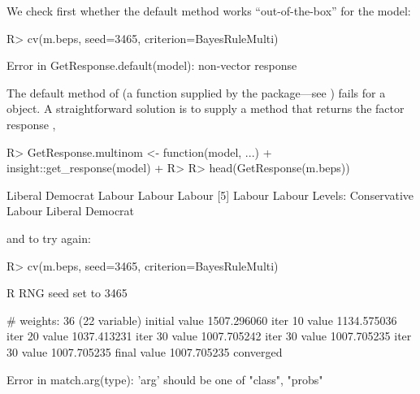 \documentclass[
]{jss}
\begin{document}
We check first whether the default  method works
``out-of-the-box'' for the  model:

\begin{CodeChunk}
\begin{CodeInput}
R> cv(m.beps, seed=3465, criterion=BayesRuleMulti)
\end{CodeInput}
\begin{CodeOutput}
Error in GetResponse.default(model): non-vector response
\end{CodeOutput}
\end{CodeChunk}

The default method of  (a function supplied by the
 package---see ) fails for a
 object. A straightforward solution is to supply a
 method that returns the factor response
\citep[using the \texttt{get\_response()} function from the
 package,][]{LudeckeWaggonerMakowski:2019},

\begin{CodeChunk}
\begin{CodeInput}
R> GetResponse.multinom <- function(model, ...) {
+   insight::get_response(model)
+ }
R> 
R> head(GetResponse(m.beps))
\end{CodeInput}
\begin{CodeOutput}
[1] Liberal Democrat Labour           Labour           Labour          
[5] Labour           Labour          
Levels: Conservative Labour Liberal Democrat
\end{CodeOutput}
\end{CodeChunk}

and to try again:

\begin{CodeChunk}
\begin{CodeInput}
R> cv(m.beps, seed=3465, criterion=BayesRuleMulti)
\end{CodeInput}
\begin{CodeOutput}
R RNG seed set to 3465
\end{CodeOutput}
\begin{CodeOutput}
# weights:  36 (22 variable)
initial  value 1507.296060 
iter  10 value 1134.575036
iter  20 value 1037.413231
iter  30 value 1007.705242
iter  30 value 1007.705235
iter  30 value 1007.705235
final  value 1007.705235 
converged
\end{CodeOutput}
\begin{CodeOutput}
Error in match.arg(type): 'arg' should be one of "class", "probs"
\end{CodeOutput}
\end{CodeChunk}
\end{document}
